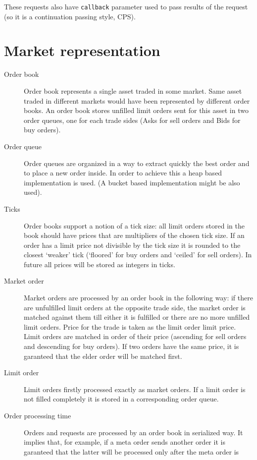 \documentclass[a4paper,11pt]{article}
\begin{document}
These requests also have \texttt{callback} parameter used to pass
results of the request (so it is a continuation passing style, CPS).


\section{Market representation}\label{market-representation}

\begin{description}
\item[Order book]
Order book represents a single asset traded in some market. Same asset
traded in different markets would have been represented by different
order books. An order book stores unfilled limit orders sent for this
asset in two order queues, one for each trade sides (Asks for sell
orders and Bids for buy orders).
\item[Order queue]
Order queues are organized in a way to extract quickly the best order
and to place a new order inside. In order to achieve this a heap based
implementation is used. (A bucket based implementation might be also
used).
\item[Ticks]
Order books support a notion of a tick size: all limit orders stored in
the book should have prices that are multipliers of the chosen tick
size. If an order has a limit price not divisible by the tick size it is
rounded to the closest `weaker' tick (`floored' for buy orders and
`ceiled' for sell orders). In future all prices will be stored as
integers in ticks.
\item[Market order]
Market orders are processed by an order book in the following way: if
there are unfulfilled limit orders at the opposite trade side, the
market order is matched against them till either it is fulfilled or
there are no more unfilled limit orders. Price for the trade is taken as
the limit order limit price. Limit orders are matched in order of their
price (ascending for sell orders and descending for buy orders). If two
orders have the same price, it is garanteed that the elder order will be
matched first.
\item[Limit order]
Limit orders firstly processed exactly as market orders. If a limit
order is not filled completely it is stored in a corresponding order
queue.
\item[Order processing time]
Orders and requests are processed by an order book in serialized way. It
implies that, for example, if a meta order sends another order it is
garanteed that the latter will be processed only after the meta order is

\end{description}
\end{document}
